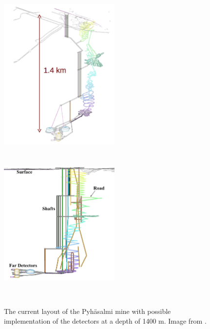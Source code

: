 \begin{figure}[htbp]
\begin{center}
\includegraphics[width=60mm,height=80mm]{Chapter2/figures/mineLayout.png}
\includegraphics[width=60mm,height=80mm]{Chapter2/figures/mineLayout2.png}
\caption{The current layout of the Pyh\"asalmi mine with possible implementation of the detectors at a depth of 1400 m. Image from \cite{lbnoInternal}.}
\label{fig:mineLayout}
\end{center}
\end{figure}

